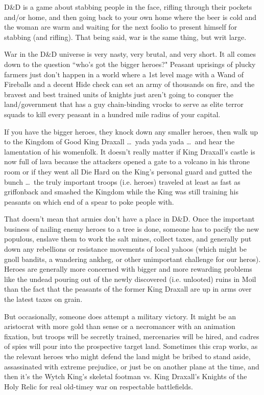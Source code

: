 D\&D is a game about stabbing people in the face, rifling through their pockets and/or home, and then going back to your own home where the beer is cold and the woman are warm and waiting for the next foolio to present himself for stabbing (and rifling). That being said, war is the same thing, but writ large.

War in the D\&D universe is very nasty, very brutal, and very short. It all comes down to the question ``who's got the bigger heroes?" Peasant uprisings of plucky farmers just don't happen in a world where a 1st level mage with a Wand of Fireballs and a decent Hide check can set an army of thousands on fire, and the bravest and best trained units of knights just aren't going to conquer the land/government that has a guy chain-binding vrocks to serve as elite terror squads to kill every peasant in a hundred mile radius of your capital.

If you have the bigger heroes, they knock down any smaller heroes, then walk up to the Kingdom of Good King Draxall  \ldots\  yada yada yada \ldots\ and hear the lamentation of his womenfolk. It doesn't really matter if King Draxall's castle is now full of lava because the attackers opened a gate to a volcano in his throne room or if they went all Die Hard on the King's personal guard and gutted the bunch \ldots\ the truly important troops (i.e. heroes) traveled at least as fast as griffonback and smashed the Kingdom while the King was still training his peasants on which end of a spear to poke people with.

That doesn't mean that armies don't have a place in D\&D. Once the important business of nailing enemy heroes to a tree is done, someone has to pacify the new populous, enslave them to work the salt mines, collect taxes, and generally put down any rebellions or resistance movements of local yahoos (which might be gnoll bandits, a wandering ankheg, or other unimportant challenge for our heros). Heroes are generally more concerned with bigger and more rewarding problems like the undead pouring out of the newly discovered (i.e. unlooted) ruins in Moil than the fact that the peasants of the former King Draxall are up in arms over the latest taxes on grain.

But occasionally, someone does attempt a military victory. It might be an aristocrat with more gold than sense or a necromancer with an animation fixation, but troops will be secretly trained, mercenaries will be hired, and cadres of spies will pour into the prospective target land. Sometimes this crap works, as the relevant heroes who might defend the land might be bribed to stand aside, assassinated with extreme prejudice, or just be on another plane at the time, and then it's the Wytch King's skeletal footman vs. King Draxall's Knights of the Holy Relic for real old-timey war on respectable battlefields.

